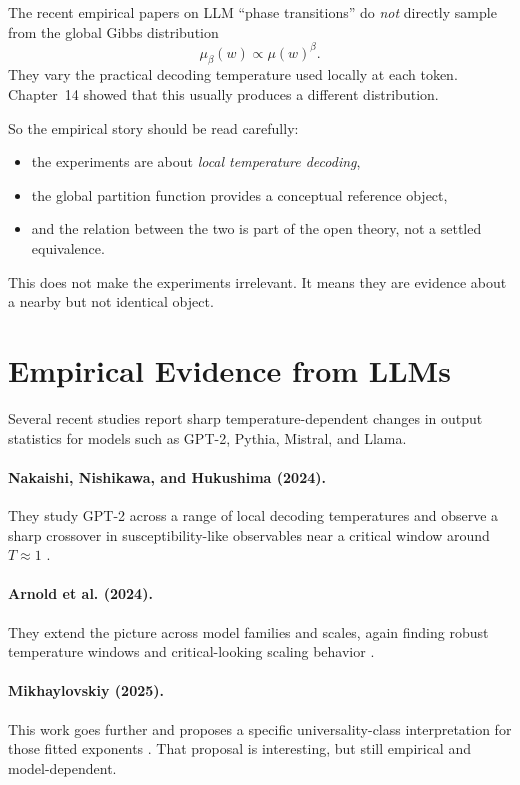 The recent empirical papers on LLM ``phase transitions'' do \emph{not} directly sample from the global Gibbs distribution
\[
  \mu_\beta(w) \propto \mu(w)^\beta.
\]
They vary the practical decoding temperature used locally at each token. Chapter~14 showed that this usually produces a different distribution.

So the empirical story should be read carefully:
\begin{itemize}
  \item the experiments are about \emph{local temperature decoding},
  \item the global partition function provides a conceptual reference object,
  \item and the relation between the two is part of the open theory, not a settled equivalence.
\end{itemize}

This does not make the experiments irrelevant. It means they are evidence about a nearby but not identical object.

\section{Empirical Evidence from LLMs}

Several recent studies report sharp temperature-dependent changes in output statistics for models such as GPT-2, Pythia, Mistral, and Llama.

\paragraph{Nakaishi, Nishikawa, and Hukushima (2024).}
They study GPT-2 across a range of local decoding temperatures and observe a sharp crossover in susceptibility-like observables near a critical window around $T \approx 1$ \cite{NakaishiNishikawaHukushima2024}.

\paragraph{Arnold et al. (2024).}
They extend the picture across model families and scales, again finding robust temperature windows and critical-looking scaling behavior \cite{ArnoldEtAl2024}.

\paragraph{Mikhaylovskiy (2025).}
This work goes further and proposes a specific universality-class interpretation for those fitted exponents \cite{Mikhaylovskiy2025}. That proposal is interesting, but still empirical and model-dependent.

